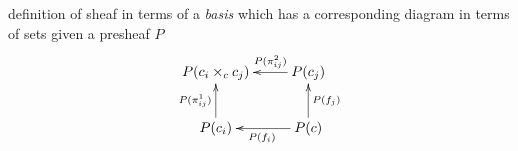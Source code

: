 \begin{frame}
\begin{block}{definition of sheaf in terms of a {\it basis}}
which has a corresponding diagram in terms of sets given a presheaf $P$
\begin{displaymath}
\xymatrix{
P(c_i \times_c c_j)  & P(c_j) \ar[l]_-{P(\pi_{ij}^2)}  \\
P(c_i) \ar[u]^-{P(\pi_{ij}^1)}  & P(c) \ar[l]^{P(f_i)} \ar[u]_{P(f_j)}
}
\end{displaymath}
\end{block}
\end{frame}